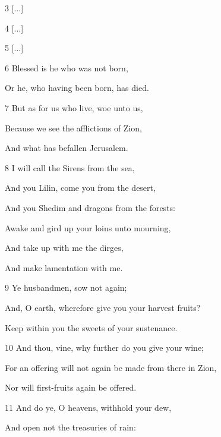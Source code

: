 \par 3 [...]

\par 4 [...]

\par 5 [...]

\par 6 Blessed is he who was not born,

\par Or he, who having been born, has died.

\par 7 But as for us who live, woe unto us,

\par Because we see the afflictions of Zion,

\par And what has befallen Jerusalem.

\par 8 I will call the Sirens from the sea,

\par And you Lilin, come you from the desert,

\par And you Shedim and dragons from the forests:

\par Awake and gird up your loins unto mourning,

\par And take up with me the dirges,

\par And make lamentation with me.

\par 9 Ye husbandmen, sow not again;

\par And, O earth, wherefore give you your harvest fruits?

\par Keep within you the sweets of your sustenance.

\par 10 And thou, vine, why further do you give your wine;

\par For an offering will not again be made from there in Zion,

\par Nor will first-fruits again be offered.

\par 11 And do ye, O heavens, withhold your dew,

\par And open not the treasuries of rain:

